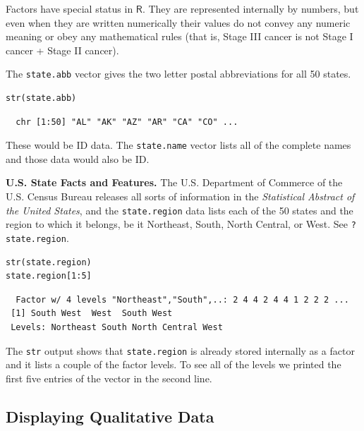 \documentclass[captions=tableheading]{scrbook}
\begin{document}
Factors have special status in \(\mathsf{R}\). They are represented internally by numbers, but even when they are written numerically their values do not convey any numeric meaning or obey any mathematical rules (that is, Stage III cancer is not Stage I cancer + Stage II cancer).

\begin{example}
The \texttt{state.abb}
vector gives the two letter postal abbreviations for all 50 states.


\lstset{language=R}
\begin{lstlisting}
str(state.abb)
\end{lstlisting}

\begin{verbatim}
  chr [1:50] "AL" "AK" "AZ" "AR" "CA" "CO" ...
\end{verbatim}

These would be ID data. The \texttt{state.name} vector lists all of the complete names and those data would also be ID.
\end{example}

\begin{example}
\textbf{U.S. State Facts and Features.} The U.S. Department of Commerce of the U.S. Census Bureau releases all sorts of information in the \emph{Statistical Abstract of the United States}, and the \texttt{state.region} data lists each of the 50 states and the region to which it belongs, be it Northeast, South, North Central, or West. See \texttt{?state.region}.


\lstset{language=R}
\begin{lstlisting}
str(state.region)
state.region[1:5]
\end{lstlisting}

\begin{verbatim}
  Factor w/ 4 levels "Northeast","South",..: 2 4 4 2 4 4 1 2 2 2 ...
 [1] South West  West  South West 
 Levels: Northeast South North Central West
\end{verbatim}

The \texttt{str} output shows that \texttt{state.region} is already stored internally as a factor and it lists a couple of the factor levels. To see all of the levels we printed the first five entries of the vector in the second line.
\end{example}
\subsection{Displaying Qualitative Data}
\label{sec-3-1-4}
\label{sub-Displaying-Qualitative-Data}
\end{document}
